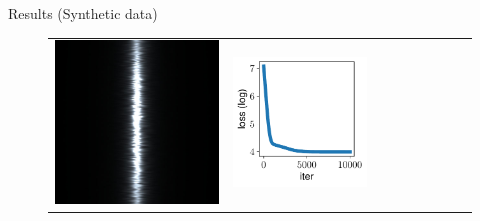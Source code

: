 \documentclass[final]{beamer}
\newlength{\twocolwid}
\newlength{\resultwidth}
\begin{document}
\begin{frame}[t]
\begin{columns}[t]
\begin{column}{\twocolwid}
\begin{block}{Results (Synthetic data)}
\begin{figure}[t]
\begin{tabular}{ccrclcccc}
            		\includegraphics[width=\resultwidth]{images/synth/metal/target.jpg} &
            		\includegraphics[width=\resultwidth]{images/synth/metal/loss.pdf} &

\end{tabular}
\end{figure}
\end{block}
\end{column}
\end{columns}
\end{frame}
\end{document}
